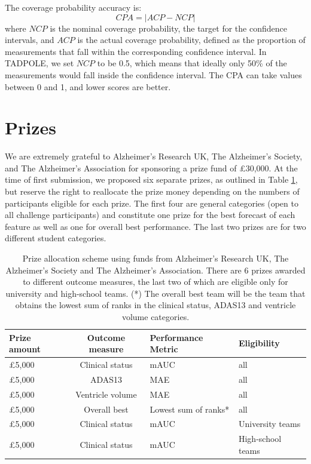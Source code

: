 The coverage probability accuracy is:
\begin{equation}
CPA = |ACP - NCP| 
\end{equation}
where $NCP$ is the nominal coverage probability, the target for the confidence intervals, and $ACP$ is the actual coverage probability, defined as the proportion of measurements that fall within the corresponding confidence interval. In TADPOLE, we set $NCP$ to be 0.5, which means that ideally only 50\% of the measurements would fall inside the confidence interval. The CPA can take values between 0 and 1, and lower scores are better.

\section{Prizes}
We are extremely grateful to Alzheimer's Research UK, The Alzheimer's Society, and The Alzheimer's Association for sponsoring a prize fund of \pounds 30,000. At the time of first submission, we proposed six separate prizes, as outlined in Table \ref{tab:prizes}, but reserve the right to reallocate the prize money depending on the numbers of participants eligible for each prize. The first four are general categories (open to all challenge participants) and constitute one prize for the best forecast of each feature as well as one for overall best performance. The last two prizes are for two different student categories.


\begin{table}[h]
\centering
 \begin{tabular}{>{\centering\arraybackslash}m{1.5cm}  c  >{\centering\arraybackslash}m{3cm}  >{\centering\arraybackslash}m{3cm}}
\textbf{Prize amount} & \textbf{Outcome measure} & \textbf{Performance Metric} & \textbf{Eligibility} \\
\hline
\pounds 5,000 & Clinical status & mAUC & all \\
\pounds 5,000 & ADAS13 & MAE & all\\
\pounds 5,000 & Ventricle volume & MAE & all\\
\pounds 5,000 & Overall best & Lowest sum of ranks* & all\\
\pounds 5,000 & Clinical status & mAUC & University teams\\
\pounds 5,000 & Clinical status & mAUC & High-school teams\\
\end{tabular}
\caption[TADPOLE prize allocation scheme using funds from AD charities]{Prize allocation scheme using funds from Alzheimer's Research UK, The Alzheimer's Society and The Alzheimer's Association. There are 6 prizes awarded to different outcome measures, the last two of which are eligible only for university and high-school teams. (*) The overall best team will be the team that obtains the lowest sum of ranks in the clinical status, ADAS13 and ventricle volume categories. }
\label{tab:prizes}
\end{table}

